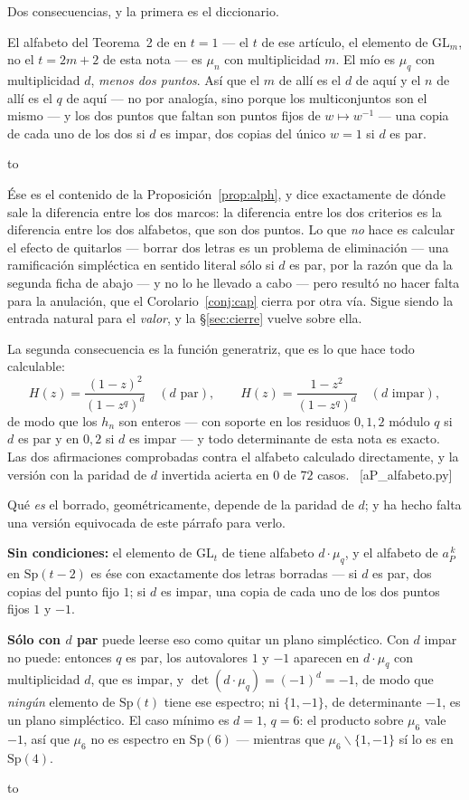 \documentclass[11pt,a4paper]{article}
\newcommand{\Sp}{\mathrm{Sp}}
\newcommand{\GL}{\mathrm{GL}}
\newcommand{\ver}[1]{\unskip\penalty0\ \textcolor{azul}{\small\textsf{[#1]}}}
\newenvironment{keybox}
  {\par\vspace{9pt}\begin{lrbox}{\fichabox}%
   \begin{minipage}{0.90\textwidth}\vspace{7pt}\setlength{\parskip}{3pt}}
  {\vspace{7pt}\end{minipage}\end{lrbox}%
   \par\noindent\hbox to \textwidth{\hfill
   \textcolor{azul}{\rule[-\dp\fichabox]{3.2pt}{\dimexpr\ht\fichabox+\dp\fichabox\relax}}%
   \colorbox{fondoficha}{\usebox{\fichabox}}\hfill}%
   \par\vspace{9pt}}
\begin{document}
Dos consecuencias, y la primera es el diccionario.

\begin{keybox}
El alfabeto del Teorema~2 de \cite{Prasad16b} en $t=1$ --- el $t$ de ese artículo, el elemento de $\GL_m$, no el $t=2m+2$ de esta
nota --- es $\mu_n$ con multiplicidad $m$. El mío es $\mu_q$ con
multiplicidad $d$, \emph{menos dos puntos}. Así que el $m$ de allí es el $d$ de aquí y el $n$ de allí es el $q$ de aquí --- no por
analogía, sino porque los multiconjuntos son el mismo --- y los dos puntos que faltan son
puntos fijos de $w\mapsto w^{-1}$ --- una copia de cada uno de los dos si $d$ es impar, dos copias
del único $w=1$ si $d$ es par.
\end{keybox}

\noindent Ése es el contenido de la Proposición~\ref{prop:alph}, y dice exactamente
de dónde sale la diferencia entre los dos marcos: la diferencia entre los dos criterios es la diferencia entre los dos
alfabetos, que son dos puntos. Lo que \emph{no} hace es calcular el efecto de quitarlos --- borrar
dos letras es un problema de eliminación --- una ramificación simpléctica en sentido literal sólo
si $d$ es par, por la razón que da la segunda ficha de abajo --- y no lo he llevado a cabo --- pero resultó no hacer falta para la
anulación, que el Corolario~\ref{conj:cap} cierra por otra vía. Sigue siendo la entrada natural para
el \emph{valor}, y la \S\ref{sec:cierre} vuelve sobre ella.

La segunda consecuencia es la función generatriz, que es lo que hace todo calculable:
\[
H(z)=\frac{(1-z)^2}{(1-z^q)^d}\quad (d\text{ par}),
\qquad
H(z)=\frac{1-z^2}{(1-z^q)^d}\quad (d\text{ impar}),
\]
de modo que los $h_n$ son enteros --- con soporte en los residuos $0,1,2$ módulo $q$ si $d$ es par
y en $0,2$ si $d$ es impar --- y todo determinante de esta nota es exacto. Las dos afirmaciones comprobadas contra el alfabeto calculado directamente, y la
versión con la paridad de $d$ invertida acierta en $0$ de $72$ casos. \ver{aP\_alfabeto.py}

\noindent Qué \emph{es} el borrado, geométricamente, depende de la paridad de $d$; y ha hecho falta
una versión equivocada de este párrafo para verlo.

\begin{keybox}
\textbf{Sin condiciones:} el elemento de $\GL_t$ de \cite{Prasad16b} tiene alfabeto $d\cdot\mu_q$, y el alfabeto de
$a_P^{\,k}$ en $\Sp(t-2)$ es ése con exactamente dos letras borradas --- si $d$ es par, dos copias
del punto fijo $1$; si $d$ es impar, una copia de cada uno de los dos puntos fijos $1$ y $-1$.

\smallskip
\textbf{Sólo con $d$ par} puede leerse eso como quitar un plano simpléctico. Con $d$ impar no puede:
entonces $q$ es par, los autovalores $1$ y $-1$ aparecen en $d\cdot\mu_q$ con multiplicidad $d$, que
es impar, y $\det(d\cdot\mu_q)=(-1)^{d}=-1$, de modo que \emph{ningún} elemento de $\Sp(t)$ tiene ese
espectro; ni $\{1,-1\}$, de determinante $-1$, es un plano simpléctico. El caso mínimo es $d=1$,
$q=6$: el producto sobre $\mu_6$ vale $-1$, así que $\mu_6$ no es espectro en $\Sp(6)$ --- mientras
que $\mu_6\smallsetminus\{1,-1\}$ sí lo es en $\Sp(4)$.
\end{keybox}
\end{document}

